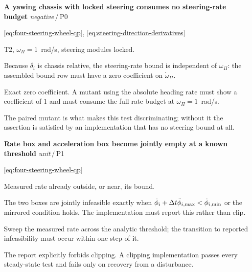 \documentclass[10pt]{article}
\newcommand{\wheelAngle}{\phi}
\newenvironment{testcard}[4]{%
  \par\medskip\noindent
  \tBlock{#1}\quad\textbf{#2}%
  \hfill{\small\textit{#3}\,/\,#4}\par\nopagebreak\vspace{2pt}
  \begin{description}[leftmargin=7.5em,style=sameline,itemsep=1pt,topsep=1pt]
}{%
  \end{description}\par\medskip
}
\begin{document}
\begin{testcard}{BND-02}{A yawing chassis with locked steering consumes no steering-rate budget}{negative}{P0}
  \item[Targets] \eqref{eq:four-steering-wheel-qp},
    \eqref{eq:steering-direction-derivatives}
  \item[Regime] T2, $\omega_{\Pi}=1$~rad/s, steering modules locked.
  \item[Invariant] Because $\delta_i$ is chassis relative, the steering-rate
    bound is independent of $\omega_{\Pi}$: the assembled bound row must have a
    zero coefficient on $\dot\omega_{\Pi}$.
  \item[Pass] Exact zero coefficient. A mutant using the absolute heading rate
    must show a coefficient of $1$ and must consume the full rate budget at
    $\omega_{\Pi}=1$~rad/s.
  \item[Diagnosis] The paired mutant is what makes this test discriminating;
    without it the assertion is satisfied by an implementation that has no
    steering bound at all.
\end{testcard}

\begin{testcard}{BND-03}{Rate box and acceleration box become jointly empty at a known threshold}{unit}{P1}
  \item[Targets] \eqref{eq:four-steering-wheel-qp}
  \item[Regime] Measured rate already outside, or near, its bound.
  \item[Invariant] The two boxes are jointly infeasible exactly when
    $\dot{\wheelAngle}_i+\samplingPeriod\ddot{\wheelAngle}_{i,\text{max}}
    <\dot{\wheelAngle}_{i,\text{min}}$ or the mirrored condition holds. The
    implementation must report this rather than clip.
  \item[Pass] Sweep the measured rate across the analytic threshold; the
    transition to reported infeasibility must occur within one step of it.
  \item[Diagnosis] The report explicitly forbids clipping. A clipping
    implementation passes every steady-state test and fails only on recovery
    from a disturbance.
\end{testcard}
\end{document}
